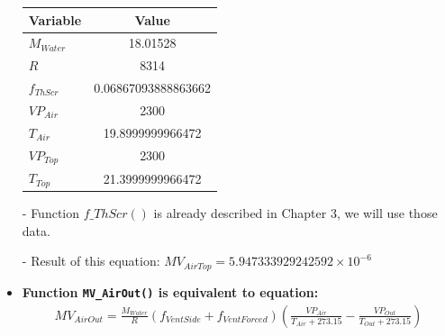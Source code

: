 \documentclass[a4paper]{article}
\numberwithin{equation}{section}
\begin{document}
\begin{itemize}
        \begin{table}[H]
          \centering
          \begin{tabular}{@{}lS[table-format=4.17]@{}}
            \toprule
            \textbf{Variable} & \textbf{Value}      \\
            \midrule
            \(M_{Water}\)     & 18.01528            \\
            \(R\)             & 8314                \\
            \(f_{ThScr}\)     & 0.06867093888863662 \\
            \(VP_{Air}\)      & 2300                \\
            \(T_{Air}\)       & 19.8999999966472    \\
            \(VP_{Top}\)      & 2300                \\
            \(T_{Top}\)       & 21.3999999966472    \\
            \bottomrule
          \end{tabular}
        \end{table}

  \item [-] Function \hyperref[fThScr]{\underline{\(f\_ThScr()\)}} is already described in Chapter 3, we will use those data.
  \item[-] Result of this equation: \(MV_{AirTop} = 5.947333929242592 \times 10^{-6} \)

  \item \textbf{Function \texttt{MV\_AirOut()} is equivalent to equation:}
        \begin{align*}
          MV_{AirOut}  = \frac{M_{Water}}{R} (f_{VentSide} + f_{VentForced}) (\frac{VP_{Air}}{T_{Air} + 273.15} - \frac{VP_{Out}}{T_{Out} + 273.15})
        \end{align*}


\end{itemize}
\end{document}
